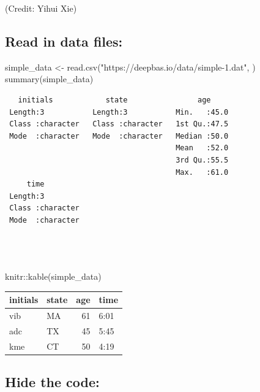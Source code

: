 \documentclass[
]{book}
\newenvironment{Shaded}{\begin{snugshade}}{\end{snugshade}}
\newcommand{\FunctionTok}[1]{\textcolor[rgb]{0.00,0.00,0.00}{#1}}
\newcommand{\NormalTok}[1]{#1}
\newcommand{\OtherTok}[1]{\textcolor[rgb]{0.56,0.35,0.01}{#1}}
\newcommand{\SpecialCharTok}[1]{\textcolor[rgb]{0.00,0.00,0.00}{#1}}
\newcommand{\StringTok}[1]{\textcolor[rgb]{0.31,0.60,0.02}{#1}}
\begin{document}
(Credit: Yihui Xie)

\hypertarget{read-in-data-files}{%
\subsection{Read in data files:}\label{read-in-data-files}}

\begin{Shaded}
\begin{Highlighting}[]
\NormalTok{simple\_data }\OtherTok{\textless{}{-}} \FunctionTok{read.csv}\NormalTok{(}\StringTok{"https://deepbas.io/data/simple{-}1.dat"}\NormalTok{, )}
\FunctionTok{summary}\NormalTok{(simple\_data) }
\end{Highlighting}
\end{Shaded}

\begin{verbatim}
   initials            state                age      
 Length:3           Length:3           Min.   :45.0  
 Class :character   Class :character   1st Qu.:47.5  
 Mode  :character   Mode  :character   Median :50.0  
                                       Mean   :52.0  
                                       3rd Qu.:55.5  
                                       Max.   :61.0  
     time          
 Length:3          
 Class :character  
 Mode  :character  
                   
                   
                   
\end{verbatim}

\begin{Shaded}
\begin{Highlighting}[]
\NormalTok{knitr}\SpecialCharTok{::}\FunctionTok{kable}\NormalTok{(simple\_data)}
\end{Highlighting}
\end{Shaded}

\begin{tabular}{l|l|r|l}
\hline
initials & state & age & time\\
\hline
vib & MA & 61 & 6:01\\
\hline
adc & TX & 45 & 5:45\\
\hline
kme & CT & 50 & 4:19\\
\hline
\end{tabular}

\hypertarget{hide-the-code}{%
\subsection{Hide the code:}\label{hide-the-code}}
\end{document}

